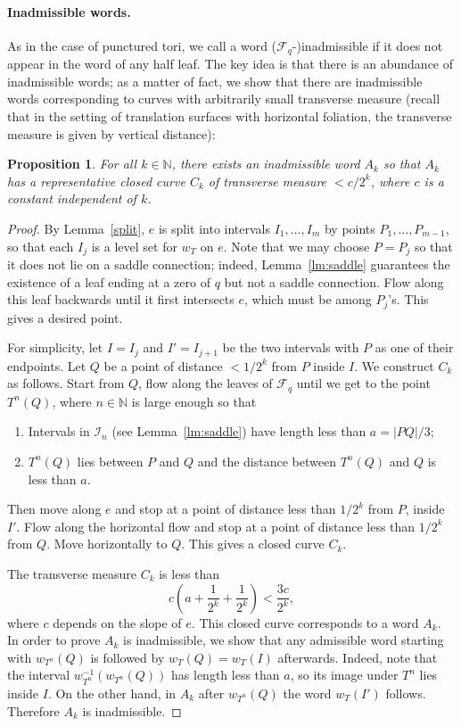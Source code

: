 \documentclass[11pt]{article} %
\theoremstyle{plain}
\newtheorem{prop}[thm]{Proposition}
\theoremstyle{definition}
\numberwithin{equation}{section}
\begin{document}
\paragraph{Inadmissible words.}
As in the case of punctured tori, we call a word ($\mathcal{F}_q$-)inadmissible if it does not appear in the word of any half leaf. The key idea is that there is an abundance of inadmissible words; as a matter of fact, we show that there are inadmissible words corresponding to curves with arbitrarily small transverse measure (recall that in the setting of translation surfaces with horizontal foliation, the transverse measure is given by vertical distance):
\begin{prop}\label{prop:inadmissible_general}
For all $k \in \mathbb{N}$, there exists an inadmissible word $A_k$ so that $A_k$ has a representative closed curve $C_k$ of transverse measure $<c/2^k$, where $c$ is a constant independent of $k$.
\end{prop} 
\begin{proof}
By Lemma~\ref{split}, $e$ is split into intervals $I_1, \dots, I_m$ by points $P_1,\ldots,P_{m-1}$, so that each $I_j$ is a level set for $w_T$ on $e$. Note that we may choose $P=P_j$ so that it does not lie on a saddle connection; indeed, Lemma~\ref{lm:saddle} guarantees the existence of a leaf ending at a zero of $q$ but not a saddle connection. Flow along this leaf backwards until it first intersects $e$, which must be among $P_j$'s. This gives a desired point.

For simplicity, let $I=I_j$ and $I'=I_{j+1}$ be the two intervals with $P$ as one of their endpoints. Let $Q$ be a point of distance $<1/2^{k}$ from $P$ inside $I$. We construct $C_k$ as follows. Start from $Q$, flow along the leaves of $\mathcal{F}_q$ until we get to the point $T^{n}(Q)$, where $n \in \mathbb{N}$ is large enough so that
\begin{enumerate}[topsep=0mm, itemsep=0mm]
    \item Intervals in $\mathcal{I}_n$ (see Lemma~\ref{lm:saddle}) have length less than $a=|PQ|/3$;
    \item $T^n(Q)$ lies between $P$ and $Q$ and the distance between $T^n(Q)$ and $Q$ is less than $a$. 
\end{enumerate} 
Then move along $e$ and stop at a point of distance less than $1/2^k$ from $P$, inside $I'$. Flow along the horizontal flow and stop at a point of distance less than $1/2^k$ from $Q$. Move horizontally to $Q$. This gives a closed curve $C_k$.

The transverse measure $C_k$ is less than 
$$c\left(a+\frac{1}{2^{k}}+\frac{1}{2^{k}}\right) < \frac{3c}{2^{k}},$$
where $c$ depends on the slope of $e$. This closed curve corresponds to a word $A_k$. In order to prove $A_k$ is inadmissible, we show that any admissible word starting with $w_{T^n}(Q)$ is followed by $w_T(Q)=w_T(I)$ afterwards. Indeed, note that the interval $w^{-1}_{T^n}(w_{T^n}(Q))$ has length less than $a$, so its image under $T^n$ lies inside $I$. On the other hand, in $A_k$ after $w_{T^n}(Q)$ the word $w_T(I')$ follows. Therefore $A_k$ is inadmissible.   
\end{proof}
\end{document}
